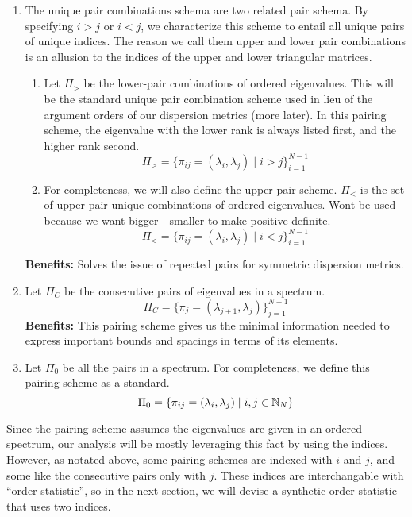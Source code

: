\begin{enumerate}
  \item The unique pair combinations schema are two related pair schema. By specifying $i > j$ or $i < j$, we  characterize this scheme to entail all unique pairs of unique indices. The reason we call them upper and lower pair combinations is an allusion to the indices of the upper and lower triangular matrices. \begin{enumerate}
    \item Let $\Pi_>$ be the lower-pair combinations of ordered eigenvalues. This will be the standard unique pair combination scheme used in lieu of the argument orders of our dispersion metrics (more later). In this pairing scheme, the eigenvalue with the lower rank is always listed first, and the higher rank second.
    $$\Pi_> = \{\pi_{ij} = (\lambda_i,\lambda_j) \mid i > j\}_{i = 1}^{N-1}$$
    \item For completeness, we will also define the upper-pair scheme. $\Pi_<$ is the set of upper-pair unique combinations of ordered eigenvalues. Wont be used because we want bigger - smaller to make positive definite.
    $$\Pi_< = \{\pi_{ij} = (\lambda_i,\lambda_j) \mid i < j\}_{i = 1}^{N-1}$$
  \end{enumerate} 
  \textbf{Benefits:} Solves the issue of repeated pairs for symmetric dispersion metrics.  
\item Let $\Pi_C$ be the consecutive pairs of eigenvalues in a spectrum. 
$$\Pi_C = \{\pi_{j} = (\lambda_{j + 1},\lambda_j)\}_{j = 1}^{N-1}$$
  \textbf{Benefits:} This pairing scheme gives us the minimal information needed to express important bounds and spacings in terms of its elements. 
  \item Let $\Pi_0$ be all the pairs in a spectrum. For completeness, we define this pairing scheme as a standard.
  $$\Pi_0 = \{\pi_{ij} = (\lambda_{i},\lambda_j) \mid i,j \in \mathbb{N}_N\}$$
\end{enumerate}

\begin{remark}
Since the pairing scheme assumes the eigenvalues are given in an ordered spectrum, our analysis will be mostly leveraging this fact by using the indices. However, as notated above, some pairing schemes are indexed with $i$ and $j$, and some like the consecutive pairs only with $j$. These indices are interchangable with ``order statistic'', so in the next section, we will devise a synthetic order statistic that uses two indices. 
\end{remark}

